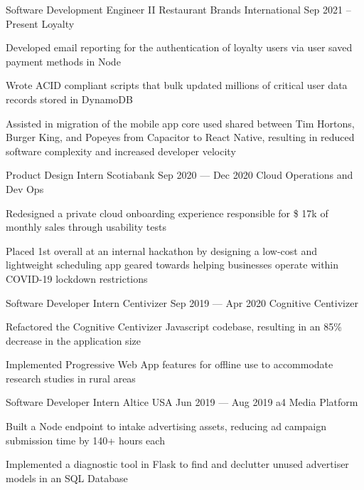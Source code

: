 \begin{cventries}
  \cventry
      {Software Development Engineer II}
      {Restaurant Brands International}
      {}
      {Sep 2021 -- Present}
      {Loyalty}
      {
        \begin{cvitems}
          \item {Developed email reporting for the authentication of loyalty users via user saved payment methods in Node}
          \item {Wrote ACID compliant scripts that bulk updated millions of critical user data records stored in DynamoDB}
          \item {Assisted in migration of the mobile app core used shared between Tim Hortons, Burger King, and Popeyes from Capacitor to React Native, resulting in reduced software complexity and increased developer velocity}
        \end{cvitems}
      }
  \cventry
    {Product Design Intern}
    {Scotiabank}
    {}
    {Sep 2020 --- Dec 2020}
    {Cloud Operations and Dev Ops}
    {
      \begin{cvitems}
        \item {Redesigned a private cloud onboarding experience responsible for \$ 17k of monthly sales through usability tests}
        \item {Placed 1st overall at an internal hackathon by designing a low-cost and lightweight scheduling app geared towards helping businesses operate within COVID-19 lockdown restrictions}
      \end{cvitems}
    }
  \cventry
    {Software Developer Intern}
    {Centivizer}
    {}
    {Sep 2019 --- Apr 2020}
    {Cognitive Centivizer}
    {
      \begin{cvitems}
        \item {Refactored the Cognitive Centivizer Javascript codebase, resulting in an 85\% decrease in the application size}
        \item {Implemented Progressive Web App features for offline use to accommodate research studies in rural areas}
      \end{cvitems}
    }

  \cventry
    {Software Developer Intern}
    {Altice USA}
    {}
    {Jun 2019 --- Aug 2019}
    {a4 Media Platform}
    {
    \begin{cvitems}
      \item {Built a Node endpoint to intake advertising assets, reducing ad campaign submission time by 140+ hours each}
      \item {Implemented a diagnostic tool in Flask to find and declutter unused advertiser models in an SQL Database}
    \end{cvitems}
    }


\end{cventries}
